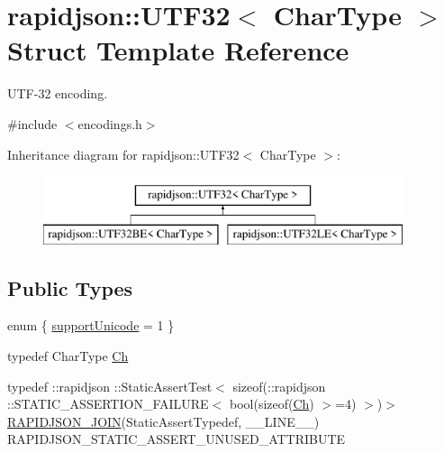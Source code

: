 \hypertarget{structrapidjson_1_1_u_t_f32}{}\section{rapidjson\+::U\+T\+F32$<$ Char\+Type $>$ Struct Template Reference}
\label{structrapidjson_1_1_u_t_f32}


U\+T\+F-\/32 encoding.  




{\ttfamily \#include $<$encodings.\+h$>$}

Inheritance diagram for rapidjson\+::U\+T\+F32$<$ Char\+Type $>$\+:\begin{figure}[H]
\begin{center}
\leavevmode
\includegraphics[height=2.000000cm]{structrapidjson_1_1_u_t_f32}
\end{center}
\end{figure}
\subsection*{Public Types}
\begin{DoxyCompactItemize}
\item 
enum \{ \mbox{\hyperlink{structrapidjson_1_1_u_t_f32_a65443b00cba1bb95baf55025108d6a54a4b93019e2b1729a70b35ba10b581ab9e}{support\+Unicode}} = 1
 \}
\item 
typedef Char\+Type \mbox{\hyperlink{structrapidjson_1_1_u_t_f32_acea97ff3d1b722b88c5faa72cfd4385e}{Ch}}
\item 
typedef \+::rapidjson \+::Static\+Assert\+Test$<$ sizeof(\+::rapidjson \+::S\+T\+A\+T\+I\+C\+\_\+\+A\+S\+S\+E\+R\+T\+I\+O\+N\+\_\+\+F\+A\+I\+L\+U\+RE$<$ bool(sizeof(\mbox{\hyperlink{structrapidjson_1_1_u_t_f32_acea97ff3d1b722b88c5faa72cfd4385e}{Ch}}) $>$=4) $>$)$>$ \mbox{\hyperlink{structrapidjson_1_1_u_t_f32_a0c4238aed24e3bb908663169bb819364}{R\+A\+P\+I\+D\+J\+S\+O\+N\+\_\+\+J\+O\+IN}}(Static\+Assert\+Typedef, \+\_\+\+\_\+\+L\+I\+N\+E\+\_\+\+\_\+) R\+A\+P\+I\+D\+J\+S\+O\+N\+\_\+\+S\+T\+A\+T\+I\+C\+\_\+\+A\+S\+S\+E\+R\+T\+\_\+\+U\+N\+U\+S\+E\+D\+\_\+\+A\+T\+T\+R\+I\+B\+U\+TE
\end{DoxyCompactItemize}
